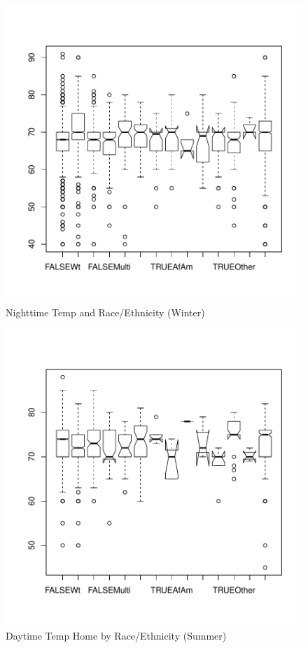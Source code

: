 \documentclass{article}
\begin{document}
\begin{figure}
\begin{center}
\caption{Nighttime Temp and Race/Ethnicity (Winter)}
\label{fig:NightRace}
\includegraphics{DraftEdwardsWoods-017}
\end{center}
\end{figure}



\begin{figure}
\begin{center}
\caption{Daytime Temp Home by Race/Ethnicity (Summer)}
\label{fig:HomeRaceS}
\includegraphics{DraftEdwardsWoods-018}
\end{center}
\end{figure}
\end{document}
